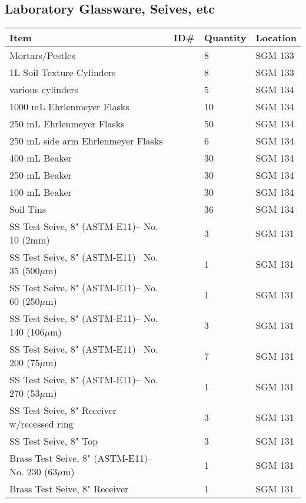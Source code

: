 \documentclass[12pt]{../SOP4_alpha}\usepackage[]{graphicx}\usepackage[]{color}
\begin{document}
\subsection{Laboratory Glassware, Seives, etc}

\begin{tabular}{|l|l|l|l|}
\hline
Item      & ID\#  & Quantity & Location \\ \hline
Mortars/Pestles             && 8 & SGM 133\\
1L Soil Texture Cylinders   && 8 & SGM 133 \\
various cylinders           && 5 & SGM 134\\
1000 mL Ehrlenmeyer Flasks && 10 & SGM 134 \\
250 mL Ehrlenmeyer Flasks && 50 & SGM 134 \\
250 mL side arm  Ehrlenmeyer Flasks && 6 & SGM 134 \\
400 mL Beaker          &&  30  & SGM 134 \\
250 mL Beaker          &&  30  & SGM 134 \\
100 mL Beaker          &&  30  & SGM 134 \\
Soil Tins                   && 36 & SGM 134\\
SS Test Seive, 8" (ASTM-E11)-- No. 10 (2mm) && 3  & SGM 131 \\
SS Test Seive, 8" (ASTM-E11)-- No. 35 (500$\mu$m) && 1  & SGM 131 \\
SS Test Seive, 8" (ASTM-E11)-- No. 60 (250$\mu$m) && 1  & SGM 131 \\
SS Test Seive, 8" (ASTM-E11)-- No. 140 (106$\mu$m) && 3  & SGM 131 \\
SS Test Seive, 8" (ASTM-E11)-- No. 200 (75$\mu$m) && 7  & SGM 131 \\
SS Test Seive, 8" (ASTM-E11)-- No. 270 (53$\mu$m) && 1  & SGM 131 \\
SS Test Seive, 8" Receiver w/recessed ring && 3  & SGM 131 \\
SS Test Seive, 8" Top                  && 3  & SGM 131 \\

Brass Test Seive, 8" (ASTM-E11)-- No. 230 (63$\mu$m) && 1  & SGM 131 \\
Brass Test Seive, 8" Receiver && 1  & SGM 131 \\



\end{tabular}
\end{document}
